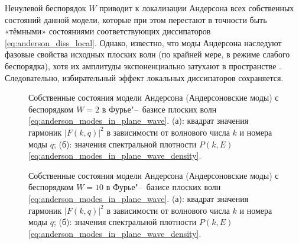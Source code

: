 Ненулевой беспорядок \(W\) приводит к локализации Андерсона всех собственных состояний данной модели, которые при этом перестают в точности быть «тёмными» состояниями соответствующих диссипаторов \cref{eq:anderson_diss_local}.
Однако, известно, что моды Андерсона наследуют фазовые свойства исходных плоских волн (по крайней мере, в режиме слабого беспорядка), хотя их амплитуды экспоненциально затухают в пространстве \cite{Ishii1973}.
Следовательно, избирательный эффект локальных диссипаторов сохраняется.
\begin{figure}[h]
	\legend{}
	\caption[Этот текст попадает в названия рисунков в списке рисунков]
	{
		Собственные состояния модели Андерсона (Андерсоновские моды) с беспорядком \(W=2\) в Фурье"--~базисе плоских волн \cref{eq:anderson_modes_in_plane_wave}. (а): квадрат значения гармоник \(\left| F(k,q) \right|^2\) в зависимости от волнового числа \(k\) и номера моды \(q\); (б): значения спектральной плотности \(P(k,E)\) \cref{eq:anderson_modes_in_plane_wave_density}.
	}
	\label{fig:anderson_modes_in_foutier_1}
\end{figure}
\begin{figure}[h]
	\legend{}
	\caption[Этот текст попадает в названия рисунков в списке рисунков]
	{
		Собственные состояния модели Андерсона (Андерсоновские моды) с беспорядком \(W=10\) в Фурье"--~базисе плоских волн \cref{eq:anderson_modes_in_plane_wave}. (а): квадрат значения гармоник \(\left| F(k,q) \right|^2\) в зависимости от волнового числа \(k\) и номера моды \(q\); (б): значения спектральной плотности \(P(k,E)\) \cref{eq:anderson_modes_in_plane_wave_density}.
	}
	\label{fig:anderson_modes_in_foutier_2}
\end{figure}
